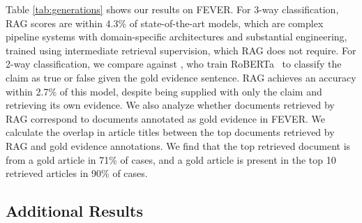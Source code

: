\documentclass{article}
\begin{document}
Table \ref{tab:generations} shows our results on FEVER. For 3-way classification, RAG scores are within 4.3\% of state-of-the-art models, which are complex pipeline systems with domain-specific architectures and substantial engineering, trained using intermediate retrieval supervision, which RAG does not require. For 2-way classification, we compare against \citet{Thorne2020AvoidingCF}, who train RoBERTa~\cite{liu-etal-2019-robust} to classify the claim as true or false given the gold evidence sentence. RAG achieves an accuracy within 2.7\% of this model, despite being supplied with only the claim and retrieving its own evidence.
We also analyze whether documents retrieved by RAG correspond to documents annotated as gold evidence in FEVER. 
We calculate the overlap in article titles between the top  documents retrieved by RAG and gold evidence annotations.
We find that the top retrieved document is from a gold article in 71\% of cases, and a gold article is present in the top 10 retrieved articles in 90\% of cases.

\subsection{Additional Results}
\label{sec:gen_div}
\end{document}
